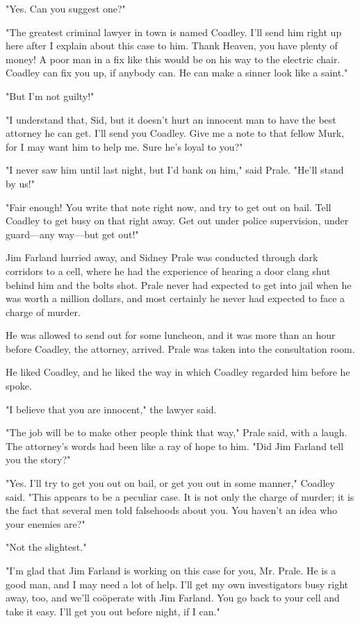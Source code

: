 \documentclass{novel}
\begin{document}
"Yes. Can you suggest one?"

"The greatest criminal lawyer in town is named Coadley. I'll send him right up here after I explain about this case to him. Thank Heaven, you have plenty of money! A poor man in a fix like this would be on his way to the electric chair. Coadley can fix you up, if anybody can. He can make a sinner look like a saint."

"But I'm not guilty!"

"I understand that, Sid, but it doesn't hurt an innocent man to have the best attorney he can get. I'll send you Coadley. Give me a note to that fellow Murk, for I may want him to help me. Sure he's loyal to you?"

"I never saw him until last night, but I'd bank on him," said Prale. "He'll stand by us!"

"Fair enough! You write that note right now, and try to get out on bail. Tell Coadley to get busy on that right away. Get out under police supervision, under guard---any way---but get out!"

Jim Farland hurried away, and Sidney Prale was conducted through dark corridors to a cell, where he had the experience of hearing a door clang shut behind him and the bolts shot. Prale never had expected to get into jail when he was worth a million dollars, and most certainly he never had expected to face a charge of murder.

He was allowed to send out for some luncheon, and it was more than an hour before Coadley, the attorney, arrived. Prale was taken into the consultation room.

He liked Coadley, and he liked the way in which Coadley regarded him before he spoke.

"I believe that you are innocent," the lawyer said.

"The job will be to make other people think that way," Prale said, with a laugh. The attorney's words had been like a ray of hope to him. "Did Jim Farland tell you the story?"

"Yes. I'll try to get you out on bail, or get you out in some manner," Coadley said. "This appears to be a peculiar case. It is not only the charge of murder; it is the fact that several men told falsehoods about you. You haven't an idea who your enemies are?"

"Not the slightest."

"I'm glad that Jim Farland is working on this case for you, Mr. Prale. He is a good man, and I may need a lot of help. I'll get my own investigators busy right away, too, and we'll coöperate with Jim Farland. You go back to your cell and take it easy. I'll get you out before night, if I can."
\end{document}
